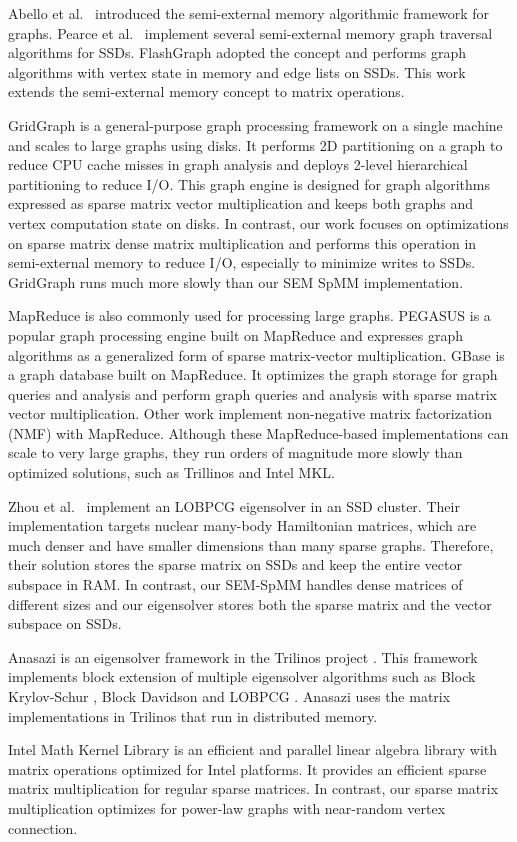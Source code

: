 Abello et al.~\cite{Abello98} introduced the semi-external memory algorithmic
framework for graphs. Pearce et al.~\cite{Pearce10} implement several 
semi-external memory graph traversal algorithms for SSDs. FlashGraph
\cite{FlashGraph} adopted the concept and performs graph algorithms with
vertex state in memory and edge lists on SSDs. This work extends the semi-external
memory concept to matrix operations.

GridGraph \cite{gridgraph} is a general-purpose graph processing framework on
a single machine
and scales to large graphs using disks. It performs 2D partitioning on a graph
to reduce CPU cache misses in graph analysis and deploys 2-level hierarchical
partitioning to reduce I/O. This graph engine is designed for graph
algorithms expressed as sparse matrix vector multiplication and keeps both
graphs and vertex computation state on disks. In contrast, our work focuses on
optimizations on sparse matrix dense matrix multiplication and performs this
operation in semi-external memory to reduce I/O, especially to minimize writes
to SSDs. GridGraph runs much more slowly than our SEM SpMM implementation.

MapReduce \cite{MapReduce} is also commonly used for processing large graphs.
PEGASUS \cite{pegasus} is a popular graph processing engine built on MapReduce
and expresses graph algorithms as a generalized form of sparse matrix-vector
multiplication. GBase \cite{gbase} is a graph database built on MapReduce.
It optimizes the graph storage for graph queries and analysis and perform graph
queries and analysis with sparse matrix vector multiplication.
Other work \cite{Liao14, Yin14, Liu10} implement non-negative matrix
factorization (NMF) with MapReduce. Although these MapReduce-based
implementations can scale to very large graphs, they run orders of
magnitude more slowly than optimized solutions, such as Trillinos and Intel MKL.

Zhou et al.~\cite{Zhou12} implement an LOBPCG \cite{Arbenz05} eigensolver in
an SSD cluster. Their implementation targets nuclear many-body Hamiltonian
matrices, which are much denser and have smaller dimensions than many sparse
graphs. Therefore, their solution stores the sparse matrix on SSDs and keep
the entire vector subspace in RAM. In contrast, our SEM-SpMM handles dense
matrices of different sizes and our eigensolver stores both the sparse matrix
and the vector subspace on SSDs.

Anasazi \cite{anasazi} is an eigensolver framework in the Trilinos project
\cite{trilinos}. This framework implements block extension of multiple
eigensolver algorithms such as Block Krylov-Schur \cite{krylovschur},
Block Davidson \cite{Arbenz05} and LOBPCG \cite{Arbenz05}. Anasazi uses
the matrix implementations in Trilinos that run in distributed memory.

Intel Math Kernel Library \cite{mkl} is an efficient and parallel linear
algebra library with matrix operations optimized for Intel
platforms. It provides an efficient sparse matrix multiplication
for regular sparse matrices. In contrast, our sparse matrix multiplication
optimizes for power-law graphs with near-random vertex connection.
